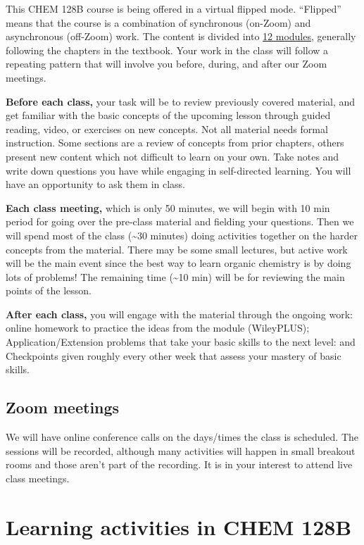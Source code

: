 This CHEM 128B course is being offered in a virtual flipped mode.
``Flipped'' means that the course is a combination of synchronous
(on-Zoom) and asynchronous (off-Zoom) work. The content is divided into
\protect\hyperlink{modules}{12 modules}, generally following the
chapters in the textbook. Your work in the class will follow a repeating
pattern that will involve you before, during, and after our Zoom
meetings.

\textbf{Before each class,} your task will be to review previously
covered material, and get familiar with the basic concepts of the
upcoming lesson through guided reading, video, or exercises on new
concepts. Not all material needs formal instruction. Some sections are a
review of concepts from prior chapters, others present new content which
not difficult to learn on your own. Take notes and write down questions
you have while engaging in self-directed learning. You will have an
opportunity to ask them in class.

\textbf{Each class meeting,} which is only 50 minutes, we will begin
with 10 min period for going over the pre-class material and fielding
your questions. Then we will spend most of the class (\textasciitilde30
minutes) doing activities together on the harder concepts from the
material. There may be some small lectures, but active work will be the
main event since the best way to learn organic chemistry is by doing
lots of problems! The remaining time (\textasciitilde10 min) will be for
reviewing the main points of the lesson.

\textbf{After each class,} you will engage with the material through the
ongoing work: online homework to practice the ideas from the module
(WileyPLUS); Application/Extension problems that take your basic skills
to the next level: and Checkpoints given roughly every other week that
assess your mastery of basic skills.

\hypertarget{zoom-meetings}{%
\subsection{Zoom meetings}\label{zoom-meetings}}

We will have online conference calls on the days/times the class is
scheduled. The sessions will be recorded, although many activities will
happen in small breakout rooms and those aren't part of the recording.
It is in your interest to attend live class meetings.

\hypertarget{learning-activities-in-chem-128b}{%
\section{Learning activities in CHEM
128B}\label{learning-activities-in-chem-128b}}

